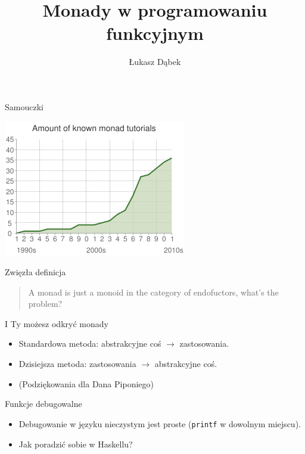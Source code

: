 \documentclass[14pt]{beamer}
\title{Monady w programowaniu funkcyjnym}
\author{Łukasz Dąbek}
\begin{document}
\begin{frame}[plain]
    \titlepage
\end{frame}

\begin{frame}{Samouczki}
    \begin{center}
        \includegraphics[scale=0.5]{monads-timeline.png}
    \end{center}
\end{frame}

\begin{frame}{Zwięzła definicja}
    \begin{quote}
        A monad is just a monoid in the category of endofuctors,
        what's the problem?
        \vskip5mm
        \hspace*{} 
    \end{quote}
\end{frame}


\begin{frame}{I Ty możesz odkryć monady}
    \begin{itemize}
        \item Standardowa metoda: abstrakcyjne coś $\rightarrow$ zastosowania.
        \pause
        \item Dzisiejsza metoda: zastosowania $\rightarrow$ abstrakcyjne coś.
        \item (Podziękowania dla Dana Piponiego)
    \end{itemize}
\end{frame}

\begin{frame}{Funkcje debugowalne}
    \begin{itemize}
        \item Debugowanie w języku nieczystym jest proste
            (\texttt{printf} w dowolnym miejscu).
        \pause
        \item Jak poradzić sobie w Haskellu?
    \end{itemize}
\end{frame}
\end{document}

